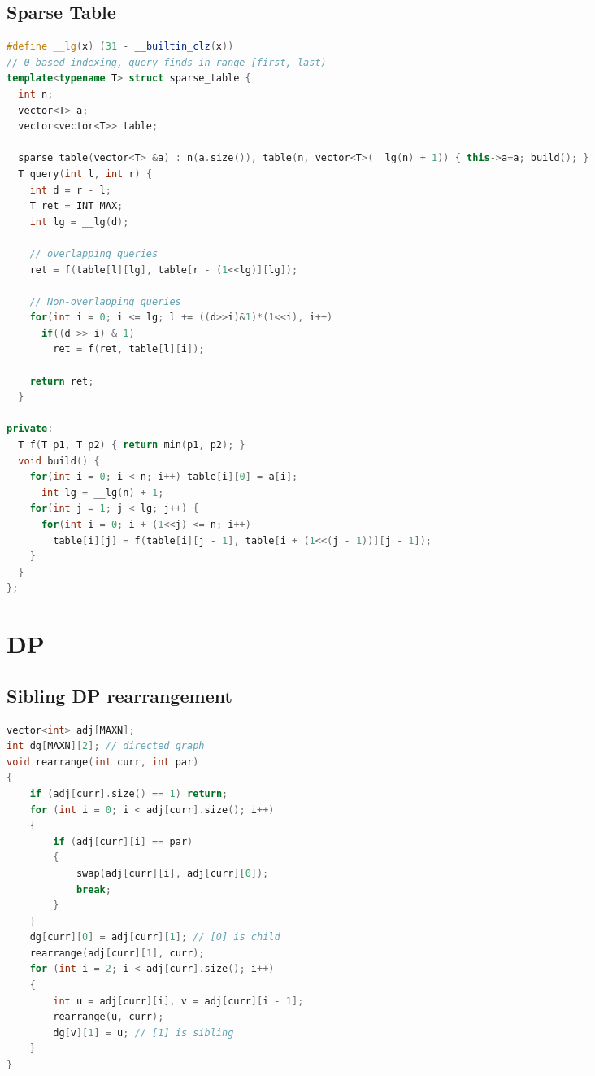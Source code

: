 \documentclass[10pt,a4paper,landscape]{article}
\begin{document}
\begin{multicols}{3}
\subsection{Sparse Table}
\begin{lstlisting}[language=C++, breaklines=true]
#define __lg(x) (31 - __builtin_clz(x))
// 0-based indexing, query finds in range [first, last)
template<typename T> struct sparse_table {
  int n;
  vector<T> a;
  vector<vector<T>> table;

  sparse_table(vector<T> &a) : n(a.size()), table(n, vector<T>(__lg(n) + 1)) { this->a=a; build(); }
  T query(int l, int r) {
    int d = r - l;
    T ret = INT_MAX;
    int lg = __lg(d);

    // overlapping queries
    ret = f(table[l][lg], table[r - (1<<lg)][lg]);

    // Non-overlapping queries
    for(int i = 0; i <= lg; l += ((d>>i)&1)*(1<<i), i++)
      if((d >> i) & 1)
        ret = f(ret, table[l][i]);
    
    return ret;
  }

private:
  T f(T p1, T p2) { return min(p1, p2); }
  void build() {
    for(int i = 0; i < n; i++) table[i][0] = a[i];
      int lg = __lg(n) + 1;
    for(int j = 1; j < lg; j++) {
      for(int i = 0; i + (1<<j) <= n; i++)
        table[i][j] = f(table[i][j - 1], table[i + (1<<(j - 1))][j - 1]);
    }
  }
};
\end{lstlisting}

\section{DP}

\subsection{Sibling DP rearrangement}
\begin{lstlisting}[language=C++,breaklines=true]
vector<int> adj[MAXN];
int dg[MAXN][2]; // directed graph
void rearrange(int curr, int par)
{
    if (adj[curr].size() == 1) return;
    for (int i = 0; i < adj[curr].size(); i++)
    {
        if (adj[curr][i] == par)
        {
            swap(adj[curr][i], adj[curr][0]);
            break;
        }
    }
    dg[curr][0] = adj[curr][1]; // [0] is child
    rearrange(adj[curr][1], curr);
    for (int i = 2; i < adj[curr].size(); i++)
    {
        int u = adj[curr][i], v = adj[curr][i - 1];
        rearrange(u, curr);
        dg[v][1] = u; // [1] is sibling
    }
}
\end{lstlisting}


\end{multicols}
\end{document}
